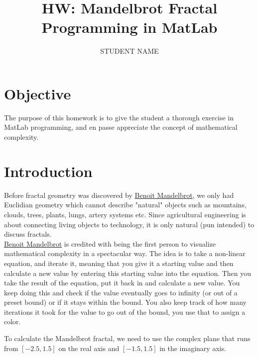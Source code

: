\documentclass[12pt,letterpaper]{article}
\author{STUDENT NAME}
\title{HW: Mandelbrot Fractal Programming in MatLab}
\begin{document}
\maketitle

\section{Objective}
The purpose of this homework is to give the student a thorough exercise in MatLab programming, and en passe appreciate the concept of mathematical complexity.\\ 

\section{Introduction}
Before fractal geometry was discovered by \href{https://en.wikipedia.org/wiki/Benoit_Mandelbrot}{Benoit Mandelbrot}, we only had Euclidian geometry which cannot describe "natural" objects such as mountains, clouds, trees, plants, lungs, artery systems etc. Since agricultural engineering is about connecting living objects to technology, it is only natural (pun intended) to discuss fractals.\\

\href{http://en.wikipedia.org/wiki/Benoit_Mandelbrot}{Benoit Mandelbrot} is credited with being the first person to visualize mathematical complexity in a spectacular way. The idea is to take a non-linear equation, and iterate it, meaning that you give it a starting value and then calculate a new value by entering this starting value into the equation. Then you take the result of the equation, put it back in and calculate a new value. You keep doing this and check if the value eventually goes to infinity (or out of a preset bound) or if it stays within the bound. You also keep track of how many iterations it took for the value to go out of the bound, you use that to assign a color.

To calculate the Mandelbrot fractal, we need to use the complex plane that runs from $[-2.5, 1.5]$ on the real axis and $[-1.5,1.5]$ in the imaginary axis. 
\end{document}
